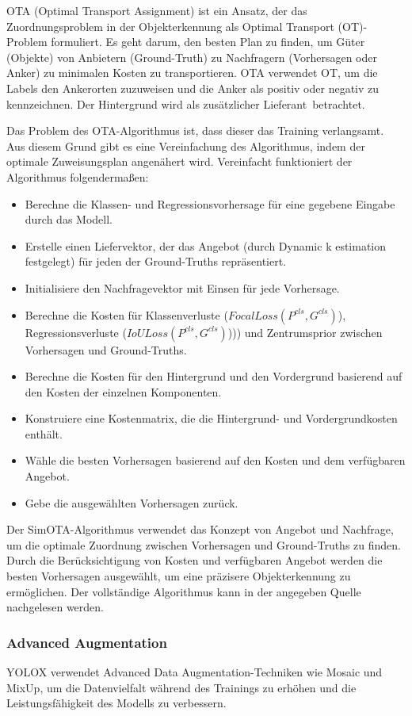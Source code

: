 OTA (Optimal Transport Assignment) ist ein Ansatz, der das Zuordnungsproblem in der Objekterkennung als Optimal Transport (OT)-Problem formuliert. Es geht darum, den besten Plan zu finden, um Güter (Objekte) von Anbietern (Ground-Truth) zu Nachfragern (Vorhersagen oder Anker) zu minimalen Kosten zu transportieren. OTA verwendet OT, um die Labels den Ankerorten zuzuweisen und die Anker als positiv oder negativ zu kennzeichnen. Der Hintergrund wird als zusätzlicher \glqq Lieferant\grqq\ betrachtet. 

Das Problem des OTA-Algorithmus ist, dass dieser das Training verlangsamt. Aus diesem Grund gibt es eine Vereinfachung des Algorithmus, indem der optimale Zuweisungsplan angenähert wird. Vereinfacht funktioniert der Algorithmus folgendermaßen:
\begin{itemize}
	\item Berechne die Klassen- und Regressionsvorhersage für eine gegebene Eingabe durch das Modell.
	\item Erstelle einen Liefervektor, der das Angebot (durch Dynamic k estimation festgelegt) für jeden der Ground-Truths repräsentiert.
	\item Initialisiere den Nachfragevektor mit Einsen für jede Vorhersage.
	\item Berechne die Kosten für Klassenverluste ($FocalLoss(P^{cls}, G^{cls})$), Regressionsverluste ($IoULoss(P^{cls}, G^{cls})$))) und Zentrumsprior zwischen Vorhersagen und Ground-Truths.
	\item Berechne die Kosten für den Hintergrund und den Vordergrund basierend auf den Kosten der einzelnen Komponenten.
	\item Konstruiere eine Kostenmatrix, die die Hintergrund- und Vordergrundkosten enthält.
	\item Wähle die besten Vorhersagen basierend auf den Kosten und dem verfügbaren Angebot.
	\item Gebe die ausgewählten Vorhersagen zurück.
\end{itemize}

Der SimOTA-Algorithmus verwendet das Konzept von Angebot und Nachfrage, um die optimale Zuordnung zwischen Vorhersagen und Ground-Truths zu finden. Durch die Berücksichtigung von Kosten und verfügbaren Angebot werden die besten Vorhersagen ausgewählt, um eine präzisere Objekterkennung zu ermöglichen. Der vollständige Algorithmus kann in der angegeben Quelle nachgelesen werden.  \cite{yoloxExplanationSimOTA}


\subsubsection{Advanced Augmentation}\label{chap:advancedAug}
YOLOX verwendet Advanced Data Augmentation-Techniken wie Mosaic und MixUp, um die Datenvielfalt während des Trainings zu erhöhen und die Leistungsfähigkeit des Modells zu verbessern.

